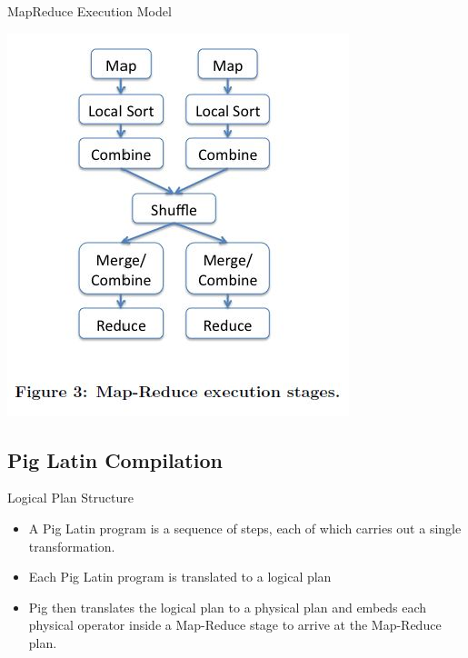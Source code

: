 \begin{frame}{MapReduce Execution Model}
\centerline{\includegraphics[scale=0.5]{Images/MapReduce_Execution.JPG}}
\let\thefootnote\relax{} 
\end{frame}

\subsection{Pig Latin Compilation}
\begin{frame}{Logical Plan Structure}
\begin{itemize}
	\item A Pig Latin program is a sequence of steps, each of which carries out a single transformation.
	\item Each Pig Latin program is translated to a logical plan
	\item Pig then translates the logical plan to a physical plan and embeds each physical operator inside a Map-Reduce stage to arrive at the Map-Reduce plan.
\end{itemize}
\end{frame}

